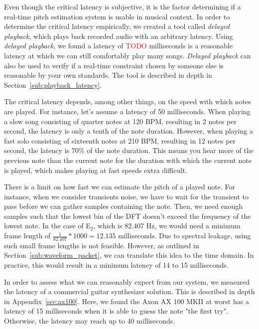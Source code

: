 \documentclass[10pt,twocolumn]{article}
\newcommand{\note}[2]{#1${}_{#2}$}
\begin{document}
Even though the critical latency is subjective, it is the factor determining if a real-time pitch estimation system is usable in musical context. In order to determine the critical latency empirically, we created a tool called \textit{delayed playback}, which plays back recorded audio with an arbitrary latency. Using \textit{delayed playback}, we found a latency of \textcolor{red}{TODO} milliseconds is a reasonable latency at which we can still comfortably play many songs. \textit{Delayed playback} can also be used to verify if a real-time constraint chosen by someone else is reasonable by your own standards. The tool is described in depth in Section~\ref{sub:playback_latency}.%

The critical latency depends, among other things, on the speed with which notes are played. For instance, let's assume a latency of 50 milliseconds. When playing a slow song consisting of quarter notes at 120 BPM, resulting in 2 notes per second, the latency is only a tenth of the note duration. However, when playing a fast solo consisting of sixteenth notes at 210 BPM, resulting in 12 notes per second, the latency is 70\% of the note duration. This means you hear more of the previous note than the current note for the duration with which the current note is played, which makes playing at fast speeds extra difficult. %

There is a limit on how fast we can estimate the pitch of a played note. For instance, when we consider transients noise, we have to wait for the transient to pass before we can gather samples containing the note. Then, we need enough samples such that the lowest bin of the DFT doesn't exceed the frequency of the lowest note. In the case of \note{E}{2}, which is 82.407 Hz, we would need a minimum frame length of $ \frac{1}{82.407} * 1000 = 12.135 $ milliseconds. Due to spectral leakage, using such small frame lengths is not feasible. However, as outlined in Section~\ref{sub:waveform_packet}, we can translate this idea to the time domain. In practice, this would result in a minimum latency of 14 to 15 milliseconds.

In order to assess what we can reasonably expect from our system, we measured the latency of a commercial guitar synthesizer solution. This is described in depth in Appendix~\ref{sec:ax100}. Here, we found the Axon AX 100 MKII at worst has a latency of 15 milliseconds when it is able to guess the note "the first try". Otherwise, the latency may reach up to 40 milliseconds.
\end{document}
